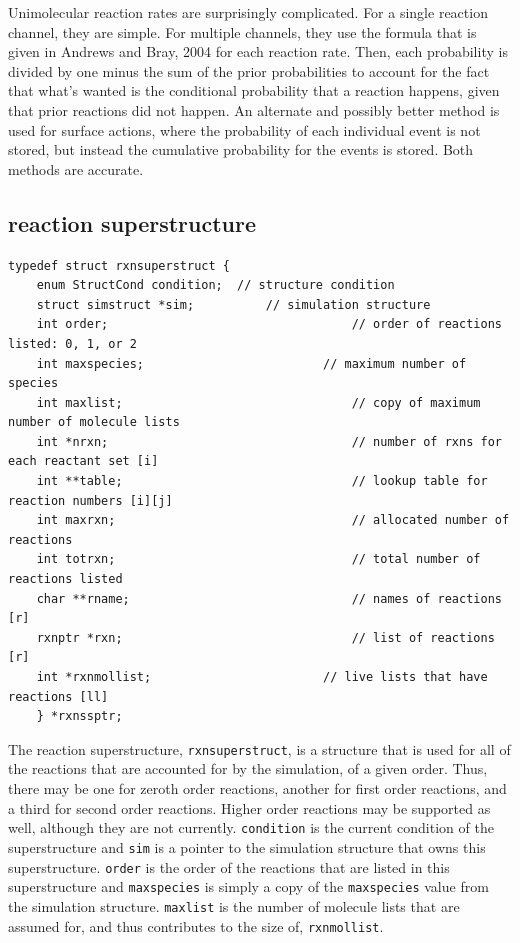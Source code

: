 \documentclass {scrbook}
\newcommand {\ttt} {\texttt}
\begin{document}
Unimolecular reaction rates are surprisingly complicated. For a single reaction channel, they are simple. For multiple channels, they use the formula that is given in Andrews and Bray, 2004 for each reaction rate. Then, each probability is divided by one minus the sum of the prior probabilities to account for the fact that what's wanted is the conditional probability that a reaction happens, given that prior reactions did not happen. An alternate and possibly better method is used for surface actions, where the probability of each individual event is not stored, but instead the cumulative probability for the events is stored. Both methods are accurate.

\subsection{reaction superstructure}

\begin{lstlisting}
typedef struct rxnsuperstruct {
	enum StructCond condition;	// structure condition
	struct simstruct *sim;			// simulation structure
	int order;									// order of reactions listed: 0, 1, or 2
	int maxspecies;							// maximum number of species
	int maxlist;								// copy of maximum number of molecule lists
	int *nrxn;									// number of rxns for each reactant set [i]
	int **table;								// lookup table for reaction numbers [i][j]
	int maxrxn;									// allocated number of reactions
	int totrxn;									// total number of reactions listed
	char **rname;								// names of reactions [r]
	rxnptr *rxn;								// list of reactions [r]
	int *rxnmollist;						// live lists that have reactions [ll]
	} *rxnssptr;
\end{lstlisting}

The reaction superstructure, \ttt{rxnsuperstruct}, is a structure that is used for all of the reactions that are accounted for by the simulation, of a given order. Thus, there may be one for zeroth order reactions, another for first order reactions, and a third for second order reactions. Higher order reactions may be supported as well, although they are not currently. \ttt{condition} is the current condition of the superstructure and \ttt{sim} is a pointer to the simulation structure that owns this superstructure. \ttt{order} is the order of the reactions that are listed in this superstructure and \ttt{maxspecies} is simply a copy of the \ttt{maxspecies} value from the simulation structure. \ttt{maxlist} is the number of molecule lists that are assumed for, and thus contributes to the size of, \ttt{rxnmollist}.
\end{document}
